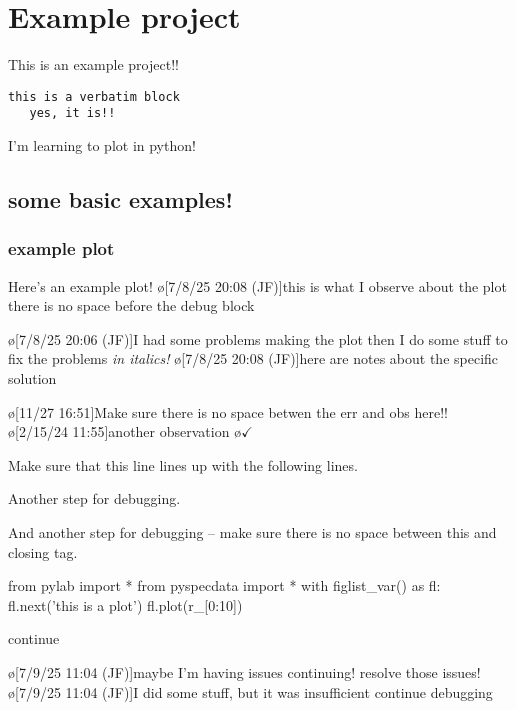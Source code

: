 \section{Example project}
This is an example project!!
\begin{verbatim}
this is a verbatim block
   yes, it is!!
\end{verbatim}
I'm learning to plot in python!

\subsection{some basic examples!}
\subsubsection{example plot}\label{sec:examplePlot1}
Here's an example plot!
\o[7/8/25 20:08 (JF)]{this is what I observe about the plot there is no space before the debug block}
\begin{err}
    \o[7/8/25 20:06 (JF)]{I had some problems making the plot}
    then I do some stuff to fix the problems
    \textit{in italics!}
    \o[7/8/25 20:08 (JF)]{here are notes about the specific solution}
\end{err}
\o[11/27 16:51]{Make sure there is no space betwen the err and obs here!!}
\o[2/15/24 11:55]{another observation}
\o{$\checkmark$}

\begin{err}
    Make sure that this line lines up with the following lines.

    Another step for debugging.

    And another step for debugging -- make sure there is no space between this and closing tag.
\end{err}
\par
\begin{python}[on]
from pylab import *
from pyspecdata import *
with figlist_var() as fl:
    fl.next('this is a plot')
    fl.plot(r_[0:10])
\end{python}
\par
continue

\begin{err}
    \o[7/9/25 11:04 (JF)]{maybe I'm having issues continuing!}
    resolve those issues!
    \o[7/9/25 11:04 (JF)]{I did some stuff, but it was insufficient}
    continue debugging

\end{err}
